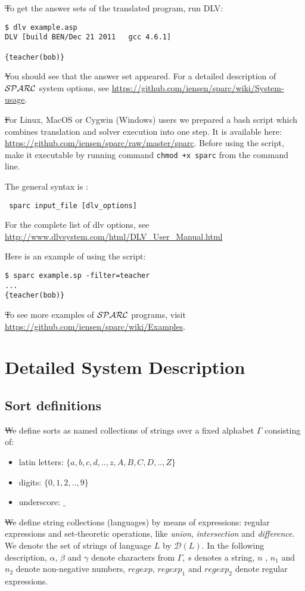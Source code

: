 \documentclass[12pt, letterpaper]{article}
\begin{document}
\st To get the answer sets of the translated program, run DLV:

\begin{verbatim}
$ dlv example.asp
DLV [build BEN/Dec 21 2011   gcc 4.6.1]

{teacher(bob)}
\end{verbatim}

\st You should see that the answer set appeared. For a detailed description of ${\cal SPARC}$ system options, see 
\url{https://github.com/iensen/sparc/wiki/System-usage}.

\st For Linux, MacOS or Cygwin (Windows) users we prepared a bash script which combines translation and solver execution into one step.
It is available here: \url{https://github.com/iensen/sparc/raw/master/sparc}. Before using the script, make it executable by running command
\texttt{chmod +x sparc} from the command line.

The general syntax is :
\begin{verbatim}
 sparc input_file [dlv_options]
\end{verbatim}
For the complete list of dlv options, see 
\url{http://www.dlvsystem.com/html/DLV_User_Manual.html }

Here is an example of using the script:
\begin{verbatim}
$ sparc example.sp -filter=teacher
...
{teacher(bob)}
\end{verbatim}
\st To see more examples of ${\cal SPARC}$ programs, visit \url{https://github.com/iensen/sparc/wiki/Examples}.
\section{Detailed System Description}

\subsection{Sort definitions}



\st We define sorts as named collections of strings over a fixed alphabet $\Gamma$ consisting of:
\begin{itemize}
 \item latin letters: $\{a,b,c,d,..,z,A,B,C,D,..,Z\}$
 \item digits: $\{0,1,2,..,9\}$
 \item underscore: $\_$
\end{itemize}

\st We define string collections (languages) by means of expressions: regular expressions and set-theoretic operations, like \textit{union}, \textit{intersection} and \textit{difference}.
We denote the set of strings of language $L$ by $\mathcal{D}(L)$. 
In the following description, $\alpha$, $\beta$ and $\gamma$ denote characters from  $\Gamma$, $s$ denotes a string, $n$ , $n_1$ and $n_2$ 
denote non-negative numbers, $regexp$, $regexp_1$ and  $regexp_2$ denote regular  expressions.
\end{document}
